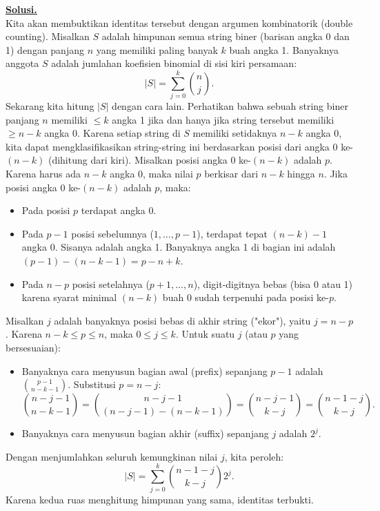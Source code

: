 \documentclass[12pt,twoside]{article}
\newenvironment{solution}
{
	\par\noindent\textbf{\underline{Solusi.}}\\
}
{
	\par
}
\begin{document}
\begin{enumerate}
        \begin{solution}
          Kita akan membuktikan identitas tersebut dengan argumen kombinatorik (double counting).
          Misalkan $S$ adalah himpunan semua string biner (barisan angka 0 dan 1) dengan panjang $n$ yang memiliki paling banyak $k$ buah angka 1.
          Banyaknya anggota $S$ adalah jumlahan koefisien binomial di sisi kiri persamaan:
          \[ |S| = \sum_{j=0}^{k} \binom{n}{j}. \]
          Sekarang kita hitung $|S|$ dengan cara lain. Perhatikan bahwa sebuah string biner panjang $n$ memiliki $\le k$ angka 1 jika dan hanya jika string tersebut memiliki $\ge n-k$ angka 0.
          Karena setiap string di $S$ memiliki setidaknya $n-k$ angka 0, kita dapat mengklasifikasikan string-string ini berdasarkan posisi dari angka 0 ke-$(n-k)$ (dihitung dari kiri).
          Misalkan posisi angka 0 ke-$(n-k)$ adalah $p$. Karena harus ada $n-k$ angka 0, maka nilai $p$ berkisar dari $n-k$ hingga $n$.
          Jika posisi angka 0 ke-$(n-k)$ adalah $p$, maka:
          \begin{itemize}
            \item Pada posisi $p$ terdapat angka 0.
            \item Pada $p-1$ posisi sebelumnya ($1, \dots, p-1$), terdapat tepat $(n-k)-1$ angka 0. Sisanya adalah angka 1. Banyaknya angka 1 di bagian ini adalah $(p-1) - (n-k-1) = p - n + k$.
            \item Pada $n-p$ posisi setelahnya ($p+1, \dots, n$), digit-digitnya bebas (bisa 0 atau 1) karena syarat minimal $(n-k)$ buah 0 sudah terpenuhi pada posisi ke-$p$.
          \end{itemize}
          Misalkan $j$ adalah banyaknya posisi bebas di akhir string ("ekor"), yaitu $j = n-p$.
          Karena $n-k \le p \le n$, maka $0 \le j \le k$.
          Untuk suatu $j$ (atau $p$ yang bersesuaian):
          \begin{itemize}
            \item Banyaknya cara menyusun bagian awal (prefix) sepanjang $p-1$ adalah $\binom{p-1}{n-k-1}$. Substitusi $p = n-j$:
                  \[ \binom{n-j-1}{n-k-1} = \binom{n-j-1}{(n-j-1) - (n-k-1)} = \binom{n-j-1}{k-j} = \binom{n-1-j}{k-j}. \]
            \item Banyaknya cara menyusun bagian akhir (suffix) sepanjang $j$ adalah $2^j$.
          \end{itemize}
          Dengan menjumlahkan seluruh kemungkinan nilai $j$, kita peroleh:
          \[ |S| = \sum_{j=0}^{k} \binom{n-1-j}{k-j} 2^j. \]
          Karena kedua ruas menghitung himpunan yang sama, identitas terbukti.
        \end{solution}



\end{enumerate}
\end{document}
